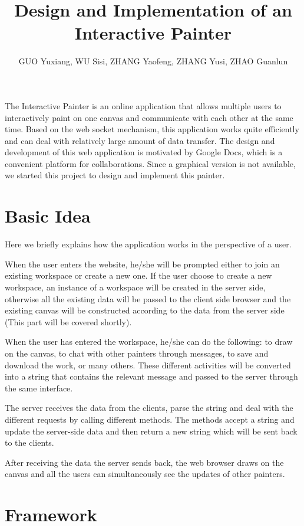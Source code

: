 \documentclass[a4paper,11pt,twocolumn]{article}
\title{
  Design and Implementation of an Interactive Painter\\
}
\author{
  GUO Yuxiang, WU Sisi, ZHANG Yaofeng, ZHANG Yusi, ZHAO Guanlun
}
\begin{document}
\maketitle

\abstract{}

The Interactive Painter is an online application that allows multiple users to
interactively paint on one canvas and communicate with each other at the same
time. Based on the web socket mechanism, this application works quite
efficiently and can deal with relatively large amount of data transfer. The
design and development of this web application is motivated by Google Docs,
which is a convenient platform for collaborations. Since a graphical version
is not available, we started this project to design and implement this
painter.

\section{Basic Idea}

Here we briefly explains how the application works in the perspective of a
user.

When the user enters the website, he/she will be prompted either to join an
existing workspace or create a new one. If the user choose to create a new
workspace, an instance of a workspace will be created in the server side,
otherwise all the existing data will be passed to the client side browser and
the existing canvas will be constructed according to the data from the server
side (This part will be covered shortly).

When the user has entered the workspace, he/she can do the following: to draw
on the canvas, to chat with other painters through messages, to save and
download the work, or many others. These different activities will be
converted into a string that contains the relevant message and passed to the
server through the same interface.

The server receives the data from the clients, parse the string and deal with
the different requests by calling different methods. The methods accept a
string and update the server-side data and then return a new string which will
be sent back to the clients.

After receiving the data the server sends back, the web browser draws on the
canvas and all the users can simultaneously see the updates of other painters.

\section{Framework}
\end{document}
